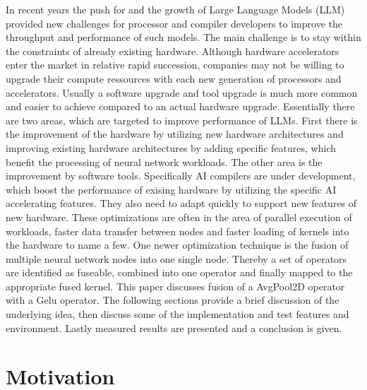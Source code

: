 \documentclass[letterpaper]{article}
\begin{document}
In recent years the push for and the growth of Large Language Models (LLM) provided new challenges for processor and compiler developers to improve the throughput and performance of such models. The main challenge is to stay within the constraints of already existing hardware. Although hardware accelerators enter the market in relative rapid succession, companies may not be willing to upgrade their compute ressources with each new generation of processors and accelerators. Usually a software upgrade and tool upgrade is much more common and easier to achieve compared to an actual hardware upgrade.  
Essentially there are two areas, which are targeted to improve performance of LLMs. First there is the improvement of the hardware by utilizing new hardware architectures and improving existing hardware architectures by adding specific features, which benefit the processing of neural network workloads. The other area is the improvement by software tools. Specifically AI compilers are under development, which boost the performance of exising hardware by utilizing the specific AI accelerating features.    They also need to adapt quickly to support new features of new hardware. These optimizations are often in the area of parallel execution of workloads, faster data transfer between nodes and faster loading of kernels into the hardware to name a few. 
One newer optimization technique is the fusion of multiple neural network nodes into one single node. Thereby a set of operators are identified as fuseable, combined into one operator and finally mapped to the appropriate fused kernel. This paper discusses fusion of a AvgPool2D  operator with a Gelu operator.  The following sections provide a brief discussion of the underlying idea, then discuss some of the implementation and test features and environment. Lastly measured results are presented and a conclusion is given. 

\section{Motivation} 
\end{document}

